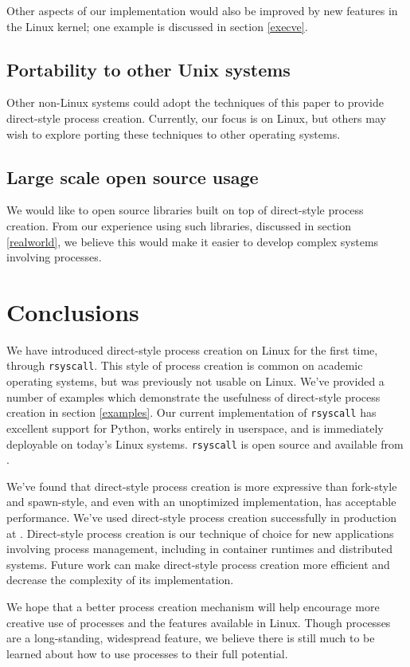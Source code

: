 \documentclass[letterpaper,twocolumn,10pt]{article}
\begin{document}
Other aspects of our implementation would also be improved by new features in the Linux kernel;
one example is discussed in section \ref{execve}.
\subsection{Portability to other Unix systems}
Other non-Linux systems
could adopt the techniques of this paper
to provide direct-style process creation.
Currently, our focus is on Linux,
but others may wish to explore porting these techniques to other operating systems.
\subsection{Large scale open source usage}
We would like to open source libraries built on top of direct-style process creation.
From our experience using such libraries, discussed in section \ref{realworld},
we believe this would make it easier to develop complex systems involving processes.
\section{Conclusions}\label{conclusions}
We have introduced direct-style process creation on Linux for the first time,
through \texttt{rsyscall}.
This style of process creation is common on academic operating systems,
but was previously not usable on Linux.
We've provided a number of examples which demonstrate the usefulness
of direct-style process creation in section \ref{examples}.
Our current implementation of \texttt{rsyscall} has excellent support for Python,
works entirely in userspace,
and is immediately deployable on today's Linux systems.
\texttt{rsyscall} is open source and available from \githuburl{}.

We've found that direct-style process creation is more expressive than fork-style and spawn-style,
and even with an unoptimized implementation, has acceptable performance.
We've used direct-style process creation successfully in production at \twosigma{}.
Direct-style process creation is our technique of choice for new applications involving process management,
including in container runtimes and distributed systems.
Future work can make direct-style process creation more efficient
and decrease the complexity of its implementation.

We hope that a better process creation mechanism
will help encourage more creative use of processes and the features available in Linux.
Though processes are a long-standing, widespread feature,
we believe there is still much to be learned about how to use processes to their full potential.


\end{document}
